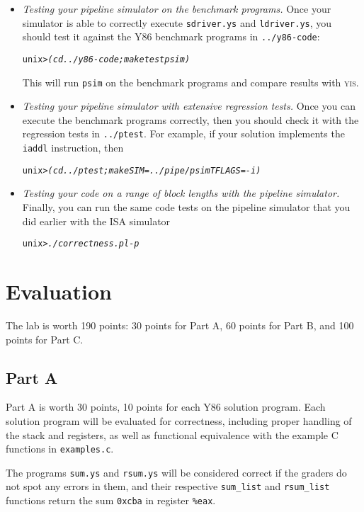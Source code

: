 \documentclass[11pt]{article}
\newenvironment{tty}%
{\small\begin{alltt}}%
{\end{alltt}}
\begin{document}
\begin{itemize}
\item {\em Testing your pipeline simulator on the benchmark programs.}
Once your simulator is able to correctly execute \texttt{sdriver.ys}
and \texttt{ldriver.ys},
you should test it against the Y86 benchmark programs in 
{\tt ../y86-code}:
\begin{tty}
unix> {\em (cd ../y86-code; make testpsim)}
\end{tty}
This will run {\tt psim} on the benchmark programs and compare 
results with \textsc{yis}.


\item {\em Testing your pipeline simulator with extensive regression tests.}
Once you can execute the benchmark programs correctly, then you should
check it with the regression tests in {\tt ../ptest}. For example,
if your solution implements the \texttt{iaddl} instruction, then
\begin{tty}
unix> {\em (cd ../ptest; make SIM=../pipe/psim TFLAGS=-i)}
\end{tty}

\item {\em Testing your code on a range of block lengths with the pipeline simulator.}
Finally, you can run the same code tests on the pipeline simulator that you did earlier with the ISA simulator
\begin{tty}
unix> {\em ./correctness.pl -p}
\end{tty}
\end{itemize}
\section{Evaluation}


The lab is worth 190 points: 30 points for Part A, 60 points for Part B,
and 100 points for Part C.

\subsection*{Part A}
Part A is worth 30 points, 10 points for each Y86 solution
program. Each solution program will be evaluated for correctness,
including proper handling of the stack and registers,
as well as functional equivalence with the example C functions in
\texttt{examples.c}.

The programs \texttt{sum.ys} and \texttt{rsum.ys} will be considered correct
if the graders do not spot any errors in them, and their respective \texttt{sum\_list} and \texttt{rsum\_list} 
functions return the sum \texttt{0xcba} in register \texttt{\%eax}.
\end{document}
